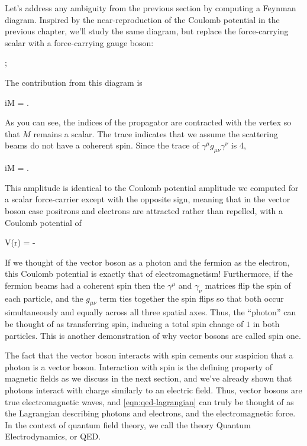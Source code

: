 Let's address any ambiguity from the previous section by computing a Feynman diagram. Inspired by the near-reproduction of the Coulomb potential in the previous chapter, we'll study the same diagram, but replace the force-carrying scalar with a force-carrying gauge boson:
\begin{center}
  ;
\end{center}
The contribution from this diagram is 
\begin{e}
  iM = \tr{}.
  \label{eqn:photon-coulomb-amplitude}
\end{e}
As you can see, the indices of the propagator are contracted with the vertex so that $M$ remains a scalar. The trace indicates that we assume the scattering beams do not have a coherent spin. Since the trace of $\gamma^\mu g_{\mu\nu} \gamma^\nu$ is 4,
\begin{e}
  iM = .
\end{e}
This amplitude is identical to the Coulomb potential amplitude we computed for a scalar force-carrier except with the opposite sign, meaning that in the vector boson case positrons and electrons are attracted rather than repelled, with a Coulomb potential of 
\begin{e}
  V(r) = -
\end{e}
If we thought of the vector boson as a photon and the fermion as the electron, this Coulomb potential is exactly that of electromagnetism! Furthermore, if the fermion beams had a coherent spin then the $\gamma^\mu$ and $\gamma_\nu$ matrices flip the spin of each particle, and the $g_{\mu \nu}$ term ties together the spin flips so that both occur simultaneously and equally across all three spatial axes. Thus, the ``photon'' can be thought of as transferring spin, inducing a total spin change of $1$ in both particles. This is another demonstration of why vector bosons are called spin one.

The fact that the vector boson interacts with spin cements our suspicion that a photon is a vector boson. Interaction with spin is the defining property of magnetic fields as we discuss in the next section, and we've already shown that photons interact with charge similarly to an electric field. Thus, vector bosons are true electromagnetic waves, and \ref{eqn:qed-lagrangian} can truly be thought of as the Lagrangian describing photons and electrons, and the electromagnetic force. In the context of quantum field theory, we call the theory Quantum Electrodynamics, or QED. 

